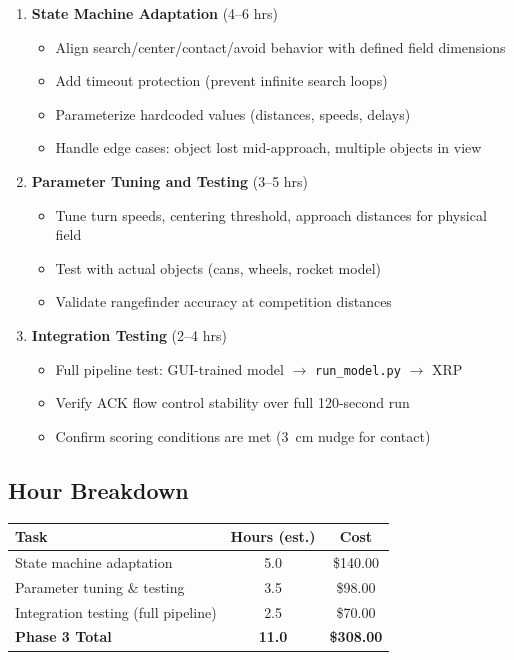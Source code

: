 \documentclass[a4paper]{article}
\begin{document}
\begin{enumerate}[leftmargin=*]
    \item \textbf{State Machine Adaptation} (4--6 hrs)
    \begin{itemize}
        \item Align search/center/contact/avoid behavior with defined field dimensions
        \item Add timeout protection (prevent infinite search loops)
        \item Parameterize hardcoded values (distances, speeds, delays)
        \item Handle edge cases: object lost mid-approach, multiple objects in view
    \end{itemize}

    \item \textbf{Parameter Tuning and Testing} (3--5 hrs)
    \begin{itemize}
        \item Tune turn speeds, centering threshold, approach distances for physical field
        \item Test with actual objects (cans, wheels, rocket model)
        \item Validate rangefinder accuracy at competition distances
    \end{itemize}

    \item \textbf{Integration Testing} (2--4 hrs)
    \begin{itemize}
        \item Full pipeline test: GUI-trained model $\rightarrow$ \texttt{run\_model.py} $\rightarrow$ XRP
        \item Verify ACK flow control stability over full 120-second run
        \item Confirm scoring conditions are met (3~cm nudge for contact)
    \end{itemize}
\end{enumerate}

\subsection*{Hour Breakdown}

\begin{center}
\begin{tabular}{lcc}
\toprule
\textbf{Task} & \textbf{Hours (est.)} & \textbf{Cost} \\
\midrule
State machine adaptation & 5.0 & \$140.00 \\
Parameter tuning \& testing & 3.5 & \$98.00 \\
Integration testing (full pipeline) & 2.5 & \$70.00 \\
\midrule
\textbf{Phase 3 Total} & \textbf{11.0} & \textbf{\$308.00} \\
\bottomrule
\end{tabular}
\end{center}
\end{document}
